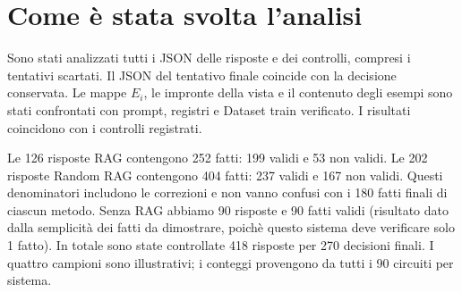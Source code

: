 \documentclass[a4paper,10pt]{article}
\begin{document}
\section*{Come è stata svolta l'analisi}
Sono stati analizzati tutti i JSON delle risposte e dei controlli, compresi i tentativi scartati. Il JSON del tentativo finale coincide con la decisione conservata. Le mappe $E_i$, le impronte della vista e il contenuto degli esempi sono stati confrontati con prompt, registri e Dataset train verificato. I risultati coincidono con i controlli registrati.\par
Le 126 risposte RAG contengono 252 fatti: 199 validi e 53 non validi. Le 202 risposte Random RAG contengono 404 fatti: 237 validi e 167 non validi. Questi denominatori includono le correzioni e non vanno confusi con i 180 fatti finali di ciascun metodo. Senza RAG abbiamo 90 risposte e 90 fatti validi (risultato dato dalla semplicità dei fatti da dimostrare, poichè questo sistema deve verificare solo 1 fatto). In totale sono state controllate 418 risposte per 270 decisioni finali. I quattro campioni sono illustrativi; i conteggi provengono da tutti i 90 circuiti per sistema.\par
\end{document}
